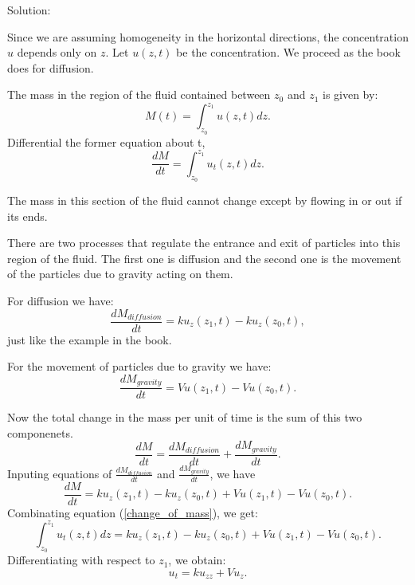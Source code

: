 \documentclass{article}
\begin{document}
			Solution:


			Since we are assuming homogeneity in the horizontal
			directions, the concentration $u$ depends only on $z$.
			Let $u(z,t)$ be the concentration. We proceed as the
			book does for diffusion.

			The mass in the region of the fluid contained between
			$z_0$ and $z_1$ is given by:
            \begin{equation*}
				M(t) = \int_{z_0}^{z_1} u(z,t)dz.
			\end{equation*}
			Differential the former equation about t,
			\begin{equation}\label{change_of_mass}
				\frac{dM}{dt}=\int_{z_0}^{z_1}u_t(z,t)dz.
			\end{equation}

			The mass in this section of the fluid cannot change
			except by flowing in or out if its ends.

			There are two processes that regulate the entrance and
			exit of particles into this region of the fluid.
			The first one is diffusion and the second one is the
			movement of the particles due to gravity acting on
			them.

			For diffusion we have:
			\[\frac{dM_{diffusion}}{dt}=ku_z(z_1,t)-ku_z(z_0,t),\]
			just like the example in the book.

			For the movement of particles due to gravity we have:
			\[\frac{dM_{gravity}}{dt} = Vu(z_1,t) - Vu(z_0,t).\]

			Now the total change in the mass per unit of time is
			the sum of this two componenets.
			\[\frac{dM}{dt}=\frac{dM_{diffusion}}{dt}+\frac{dM_{gravity}}{dt}.\]
			Inputing equations of $\frac{dM_{diffusion}}{dt} $ and $\frac{dM_{gravity}}{dt} $, we have
            \[\frac{dM}{dt}=ku_z(z_1,t)-ku_z(z_0,t) + Vu(z_1,t) - Vu(z_0,t). \]			
			Combinating equation (\ref{change_of_mass}), we get:
			\[\int_{z_0}^{z_1}u_t(z,t)dz= ku_z(z_1,t)-ku_z(z_0,t) + Vu(z_1,t) - Vu(z_0,t).\]
			Differentiating with respect to $z_1$, we obtain:
			\[
				u_t=ku_{zz}+Vu_z.
			\]
\end{document}
